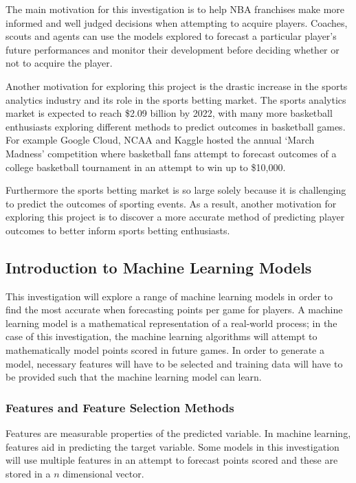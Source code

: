 \documentclass[a4paper,11pt,twoside]{article}
\begin{document}
The main motivation for this investigation is to help NBA franchises make more informed and well judged decisions when attempting to acquire players. Coaches, scouts and agents can use the models explored  to forecast a particular player's future performances and monitor their development before deciding whether or not to acquire the player. 

Another motivation for exploring this project is the drastic increase in the sports analytics industry and its role in the sports betting market. The sports analytics market is expected to reach \$2.09 billion by 2022, with many more basketball enthusiasts exploring different methods to predict outcomes in basketball games. For example Google Cloud, NCAA and Kaggle hosted the annual `March Madness' competition where basketball fans attempt to forecast outcomes of a college basketball tournament in an attempt to win up to \$10,000.

 Furthermore the sports betting market is so large solely because it is challenging to predict the outcomes of sporting events. As a result, another motivation for exploring this project is to discover a more accurate method of predicting player outcomes to better inform sports betting enthusiasts. 
 
 \subsection{Introduction to Machine Learning Models}

This investigation will explore a range of machine learning models in order to find the most accurate when forecasting points per game for players. A machine learning model is a mathematical representation of a real-world process; in the case of this investigation, the machine learning algorithms will attempt to mathematically model points scored in future games. In order to generate a model, necessary features will have to be selected and training data will have to be provided such that the machine learning model can learn.


\subsubsection{Features and Feature Selection Methods}
Features are measurable properties of the predicted variable. In machine learning, features aid in predicting the target variable. Some models in this investigation will use multiple features in an attempt to forecast points scored and these are stored in a $n$ dimensional vector.
\end{document}
